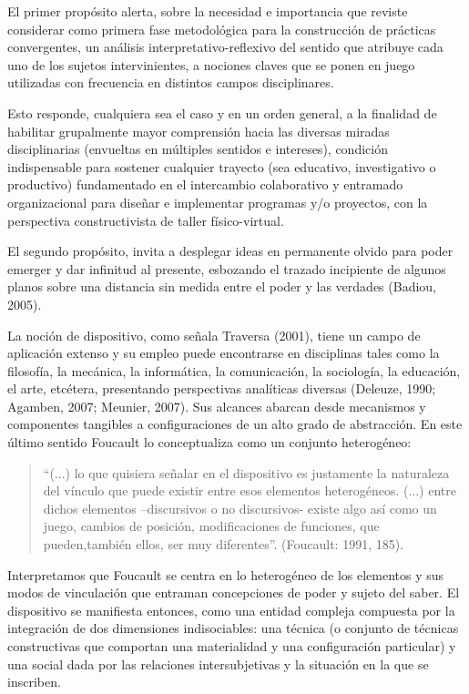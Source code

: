 El primer propósito alerta, sobre la necesidad e importancia que
reviste considerar como primera fase metodológica para la construcción de
prácticas convergentes, un análisis interpretativo-reflexivo del sentido que
atribuye cada uno de los sujetos intervinientes, a nociones claves que se
ponen en juego utilizadas con frecuencia en distintos campos disciplinares. 

Esto responde, cualquiera sea el caso y en un orden general, a la finalidad
de habilitar grupalmente mayor comprensión hacia las diversas miradas
disciplinarias (envueltas en múltiples sentidos e intereses), condición
indispensable para sostener  cualquier trayecto (sea  educativo, investigativo o
productivo) fundamentado en el intercambio colaborativo y entramado
organizacional para diseñar e implementar programas y/o proyectos, con la
perspectiva constructivista de taller físico-virtual.

El segundo propósito, invita a desplegar ideas en permanente olvido
para poder emerger y dar infinitud al presente, esbozando el trazado
incipiente de algunos planos sobre una distancia sin medida entre el poder
y las verdades (Badiou, 2005).

La noción de dispositivo, como señala Traversa (2001), tiene un
campo de aplicación extenso y su empleo puede encontrarse en disciplinas
tales como la filosofía, la mecánica, la informática, la comunicación, la
sociología, la educación, el arte, etcétera, presentando perspectivas
analíticas diversas (Deleuze, 1990; Agamben, 2007; Meunier, 2007). Sus
alcances abarcan  desde mecanismos y  componentes tangibles a
configuraciones de un alto grado de abstracción. En este último sentido
Foucault lo conceptualiza como un conjunto heterogéneo:
      
      
\begin{quote} 
      “(...) lo que quisiera señalar en el dispositivo es justamente la
      naturaleza del vínculo que puede existir entre esos elementos
      heterogéneos. (...) entre dichos elementos –discursivos o no
      discursivos- existe algo así como un juego, cambios de posición,
      modificaciones de funciones, que pueden,también ellos, ser muy
      diferentes”. (Foucault: 1991, 185).
\end{quote} 

Interpretamos que Foucault se centra en lo heterogéneo de los
elementos y sus modos de vinculación que entraman concepciones de
poder y sujeto del saber. El dispositivo se manifiesta entonces, como una
entidad compleja compuesta por la integración de dos dimensiones
indisociables: una técnica (o conjunto de técnicas constructivas que
comportan una materialidad y una configuración particular) y una social
dada por las relaciones intersubjetivas y la situación en la que se
inscriben. 

